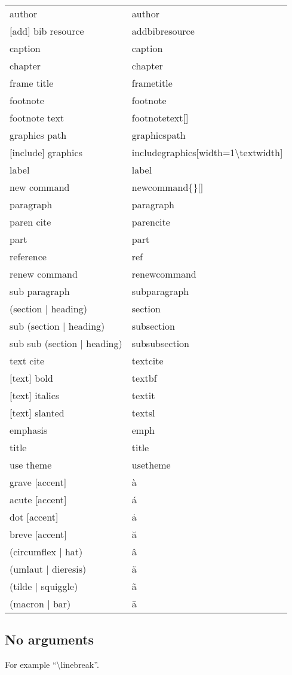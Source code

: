 \documentclass[12pt, a4paper]{article}
\begin{document}
\begin{longtable}{ll}
author & author \\
{[add]} bib resource & addbibresource \\
caption & caption \\
chapter & chapter \\
frame title & frametitle \\
footnote & footnote \\
footnote text & footnotetext[] \\
graphics path & graphicspath \\
{[include]} graphics & includegraphics[width=1\textbackslash textwidth] \\
label & label \\
new command & newcommand\{\}[] \\
paragraph & paragraph \\
paren cite & parencite \\
part & part \\
reference & ref \\
renew command & renewcommand \\
sub paragraph & subparagraph \\
(section | heading) & section \\
sub (section | heading) & subsection \\
sub sub (section | heading) & subsubsection \\
text cite & textcite \\
{[text]} bold & textbf \\
{[text]} italics & textit \\
{[text]} slanted & textsl \\
emphasis & emph \\
title & title \\
use theme & usetheme \\
\hline
grave [accent] & \`{a} \\
acute [accent] & \'{a} \\
dot [accent] & \.{a} \\
breve [accent] & \u{a} \\
(circumflex | hat) & \^{a} \\
(umlaut | dieresis) & \"{a} \\
(tilde | squiggle) & \~{a} \\
(macron | bar) & \={a} \\
\end{longtable}

\subsection{No arguments}
For example ``\textbackslash linebreak''.
\end{document}
